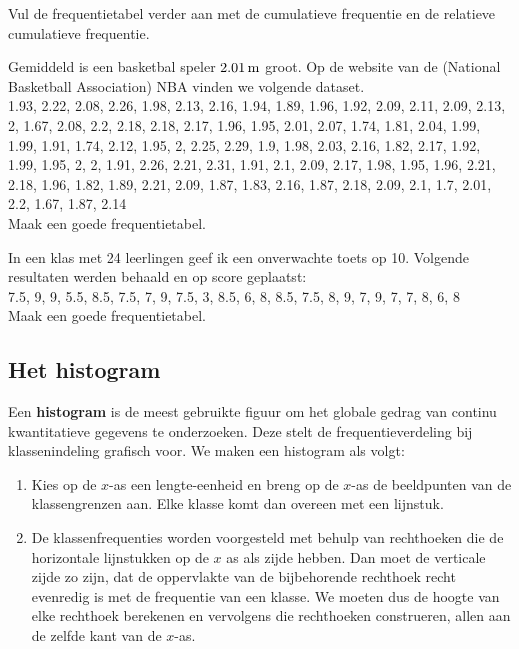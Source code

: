 \documentclass[12pt,twoside]{article}
\begin{document}
Vul de frequentietabel verder aan met de cumulatieve frequentie en de relatieve cumulatieve frequentie.

\begin{oefening}
Gemiddeld is een basketbal speler $2.01 \m$ groot. Op de website van de (National Basketball Association) NBA vinden we volgende dataset.\\

1.93, 2.22, 2.08, 2.26, 1.98, 2.13, 2.16, 1.94, 1.89, 1.96, 1.92, 2.09, 2.11, 2.09, 2.13, 2, 1.67, 2.08, 2.2, 2.18, 2.18, 2.17, 1.96, 1.95, 2.01, 2.07, 1.74, 1.81, 2.04, 1.99, 1.99, 1.91, 1.74, 2.12, 1.95, 2, 2.25, 2.29, 1.9, 1.98, 2.03, 2.16, 1.82, 2.17, 1.92, 1.99, 1.95, 2, 2, 1.91, 2.26, 2.21, 2.31, 1.91, 2.1, 2.09, 2.17, 1.98, 1.95, 1.96, 2.21, 2.18, 1.96, 1.82, 1.89, 2.21, 2.09, 1.87, 1.83, 2.16, 1.87, 2.18, 2.09, 2.1, 1.7, 2.01, 2.2, 1.67, 1.87, 2.14\\

Maak een goede frequentietabel.
\end{oefening}

\begin{oefening}
In een klas met 24 leerlingen geef ik een onverwachte toets op 10. Volgende resultaten werden behaald en op score geplaatst:\\

7.5, 9, 9, 5.5, 8.5, 7.5, 7, 9, 7.5, 3, 8.5, 6, 8, 8.5, 7.5, 8, 9, 7, 9, 7, 7, 8, 6, 8\\

Maak een goede frequentietabel.
\end{oefening}

\pagebreak
\subsection{Het histogram}

Een {\bf histogram} is de meest gebruikte figuur om het globale gedrag van continu
kwantitatieve gegevens te onderzoeken. Deze stelt de frequentieverdeling bij klassenindeling
grafisch voor. We maken een histogram als volgt:

\begin{enumerate}
  \item Kies op de $x$-as een lengte-eenheid en breng op de $x$-as de beeldpunten van de klassengrenzen aan. Elke klasse komt dan overeen met een lijnstuk.
  \item De klassenfrequenties worden voorgesteld met behulp van rechthoeken die de horizontale lijnstukken op de $x$ as als zijde hebben. Dan moet de verticale zijde zo zijn, dat de oppervlakte van de bijbehorende rechthoek recht evenredig is met de frequentie van een klasse. We moeten dus de hoogte van elke rechthoek berekenen en vervolgens die rechthoeken construeren, allen aan de zelfde kant van de $x$-as.
\end{enumerate}
\end{document}
